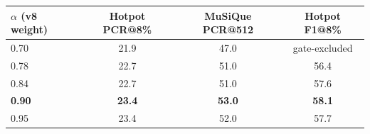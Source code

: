 \begin{tabular}{@{}lccc@{}}
\toprule
$\alpha$ (v8 weight) & Hotpot PCR@8\% & MuSiQue PCR@512 & Hotpot F1@8\% \\
\midrule
0.70 & 21.9 & 47.0 & gate-excluded \\
0.78 & 22.7 & 51.0 & 56.4 \\
0.84 & 22.7 & 51.0 & 57.6 \\
\textbf{0.90} & \textbf{23.4} & \textbf{53.0} & \textbf{58.1} \\
0.95 & 23.4 & 52.0 & 57.7 \\
\bottomrule
\end{tabular}
